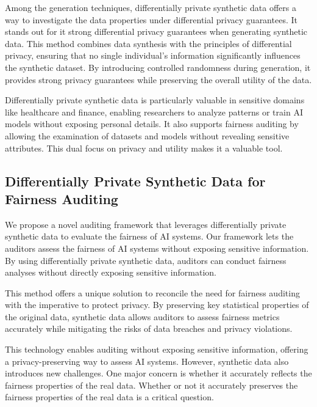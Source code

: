 \documentclass[manuscript,screen,review,anonymous]{acmart}
\begin{document}
Among the generation techniques, differentially private synthetic data offers a way to investigate the data properties under differential privacy guarantees. It stands out for it strong differential privacy guarantees when generating synthetic data. This method combines data synthesis with the principles of differential privacy, ensuring that no single individual's information significantly influences the synthetic dataset. By introducing controlled randomness during generation, it provides strong privacy guarantees while preserving the overall utility of the data.

Differentially private synthetic data is particularly valuable in sensitive domains like healthcare and finance, enabling researchers to analyze patterns or train AI models without exposing personal details. It also supports fairness auditing by allowing the examination of datasets and models without revealing sensitive attributes. This dual focus on privacy and utility makes it a valuable tool.

\subsection{Differentially Private Synthetic Data for Fairness Auditing}


We propose a novel auditing framework that leverages differentially private synthetic data to evaluate the fairness of AI systems. Our framework lets the auditors assess the fairness of AI systems without exposing sensitive information. By using differentially private synthetic data, auditors can conduct fairness analyses without directly exposing sensitive information.

This method offers a unique solution to reconcile the need for fairness auditing with the imperative to protect privacy. By preserving key statistical properties of the original data, synthetic data allows auditors to assess fairness metrics accurately while mitigating the risks of data breaches and privacy violations.

This technology enables auditing without exposing sensitive information, offering a privacy-preserving way to assess AI systems. However, synthetic data also introduces new challenges. One major concern is whether it accurately reflects the fairness properties of the real data. Whether or not it accurately preserves the fairness properties of the real data is a critical question.
\end{document}
